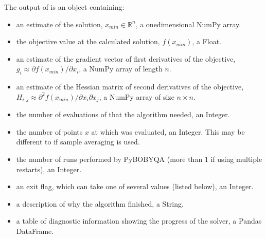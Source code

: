 \documentclass[letterpaper,10pt,english]{sphinxmanual}
\begin{document}
The output of  is an object containing:
\begin{itemize}
\item {} 
 \sphinxhyphen{} an estimate of the solution, \(x_{min}\in\mathbb{R}^n\), a one\sphinxhyphen{}dimensional NumPy array.

\item {} 
 \sphinxhyphen{} the objective value at the calculated solution, \(f(x_{min})\), a Float.

\item {} 
 \sphinxhyphen{} an estimate of the gradient vector of first derivatives of the objective, \(g_i \approx \partial f(x_{min})/\partial x_i\), a NumPy array of length \(n\).

\item {} 
 \sphinxhyphen{} an estimate of the Hessian matrix of second derivatives of the objective, \(H_{i,j} \approx \partial^2 f(x_{min})/\partial x_i \partial x_j\), a NumPy array of size \(n\times n\).

\item {} 
 \sphinxhyphen{} the number of evaluations of  that the algorithm needed, an Integer.

\item {} 
 \sphinxhyphen{} the number of points \(x\) at which  was evaluated, an Integer. This may be different to  if sample averaging is used.

\item {} 
 \sphinxhyphen{} the number of runs performed by Py\sphinxhyphen{}BOBYQA (more than 1 if using multiple restarts), an Integer.

\item {} 
 \sphinxhyphen{} an exit flag, which can take one of several values (listed below), an Integer.

\item {} 
 \sphinxhyphen{} a description of why the algorithm finished, a String.

\item {} 
 \sphinxhyphen{} a table of diagnostic information showing the progress of the solver, a Pandas DataFrame.

\end{itemize}
\end{document}
